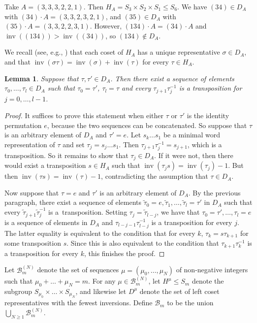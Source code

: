 \documentclass[11pt]{article}
\numberwithin{equation}{section}
\numberwithin{equation}{section}
\newtheorem{Lemma}[Theorem]{Lemma}
\DeclareMathOperator{\inv}{inv}
\begin{document}
 \begin{Example} Take $ A= (3,3,3,2,2,1).$ Then $H_A=S_3 \times S_2 \times S_1 \leq S_6$. We have $ (34) \in D_A $ with $ (34) \cdot A= (3,3,2,3,2,1)$, and $ (35) \in D_A $ with $ (35)\cdot A=(3,3,2,2,3,1) $. However, $ (134)\cdot A= (34) \cdot A$ and $\inv((134)) > \inv((34))$, so $ (134) \notin D_A $.
 \end{Example}

 We recall (see, e.g., \cite{Carter}) that each coset of $H_A$ has a unique representative $\sigma \in D_A$, and that $\inv(\sigma\tau) = \inv(\sigma) + \inv(\tau)$ for every $\tau \in H_A$.

 \begin{Lemma}\label{Gene}
 	Suppose that $\tau,\tau' \in D_A$. Then there exist a sequence of elements $\tau_0,\dots,\tau_l\in D_A$ such that $\tau_0 = \tau'$, $\tau_l=\tau$ and every $\tau_{j+1}\tau_j^{-1}$ is a transposition for $j=0,\dots,l-1$.
 \end{Lemma}
 \begin{proof}
 	It suffices to prove this statement when either $\tau$ or $\tau'$ is the identity permutation $e$, because the two sequences can be concatenated. So suppose that $\tau$ is an arbitrary element of $D_A$ and $\tau'=e$. Let $s_k\dots s_1$ be a minimal word representation of $\tau$ and set $\tau_j = s_j \dots s_1$. Then $\tau_{j+1}\tau_j^{-1}=s_{j+1}$, which is a transposition. So it remains to show that $\tau_j \in D_A$. If it were not, then there would exist a transposition $s\in H_A$ such that $\inv(\tau_js) = \inv(\tau_j)-1$. But then $\inv(\tau s) = \inv(\tau)-1$, contradicting the assumption that $\tau \in D_A$.
 	
 	Now suppose that $\tau=e$ and $\tau'$ is an arbitrary element of $D_A$. By the previous paragraph, there exist a sequence of elements $\tilde{\tau}_0=e,\tilde{\tau}_1,\dots,\tilde{\tau}_l=\tau'$ in $D_A$ such that every $\tilde{\tau}_{j+1}\tilde{\tau}_j^{-1}$ is a~transposition. Setting $\tau_j = \tilde{\tau}_{l-j}$, we have that $\tau_0=\tau',\dots,\tau_l=e$ is a sequence of elements in $D_A$ and ${\tau}_{l-j-1}{\tau}_{l-j}^{-1}$ is a transposition for every $j$. The latter equality is equivalent to the condition that for every $k$, $\tau_k = s\tau_{k+1}$ for some transposition $s$. Since this is also equivalent to the condition that $\tau_{k+1}\tau_k^{-1}$ is a transposition for every $k$, this finishes the proof.
 \end{proof}

 Let $ \mathcal{B}_m^{(N)} $ denote the set of sequences $ \mu=(\mu_0,\dots,\mu_N) $ of non-negative integers such that $ \mu_0+\dots+\mu_N=m $. For any $ \mu \in \mathcal{B}_m^{(N)} $, let $ H^\mu \le S_m$ denote the subgroup $ S_{\mu_0}\times \dots \times S_{\mu_N} $, and likewise let $ D^\mu $ denote the set of left coset representatives with the fewest inversions. Define $\mathcal{B}_m$ to be the union $\bigcup_{N\geq 1} \mathcal{B}_m^{(N)}$.
\end{document}
